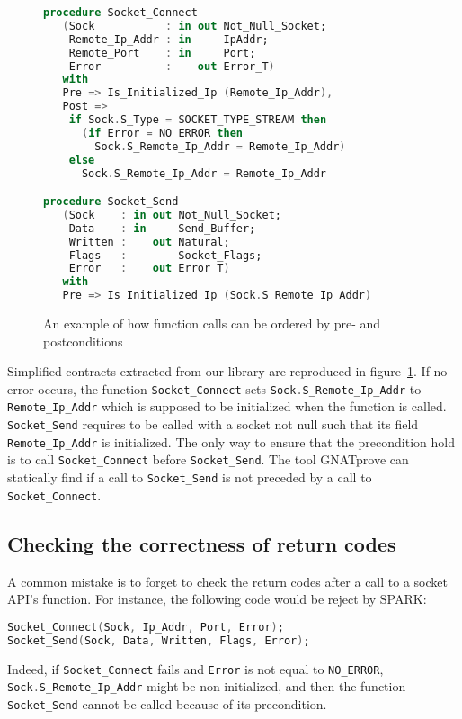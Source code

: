 \documentclass[conference]{IEEEtran}
\def\spark#1{\lstinline[language=Ada]{#1}}
\begin{document}
\begin{figure}
\begin{lstlisting}[language=Ada,basicstyle=\footnotesize\ttfamily]
procedure Socket_Connect
   (Sock           : in out Not_Null_Socket;
    Remote_Ip_Addr : in     IpAddr;
    Remote_Port    : in     Port;
    Error          :    out Error_T)
   with
   Pre => Is_Initialized_Ip (Remote_Ip_Addr),
   Post =>
    if Sock.S_Type = SOCKET_TYPE_STREAM then
      (if Error = NO_ERROR then
        Sock.S_Remote_Ip_Addr = Remote_Ip_Addr)
    else
      Sock.S_Remote_Ip_Addr = Remote_Ip_Addr

procedure Socket_Send
   (Sock    : in out Not_Null_Socket;
    Data    : in     Send_Buffer;
    Written :    out Natural;
    Flags   :        Socket_Flags;
    Error   :    out Error_T)
   with
   Pre => Is_Initialized_Ip (Sock.S_Remote_Ip_Addr)
\end{lstlisting}
\caption{An example of how function calls can be ordered by pre- and
postconditions}
\label{fig:functionorder}
\end{figure}

Simplified contracts extracted from our library are reproduced in
figure~\ref{fig:functionorder}. If no error occurs, the function
\spark{Socket_Connect} sets \spark{Sock.S_Remote_Ip_Addr} to
\spark{Remote_Ip_Addr} which is supposed to be
initialized when the function is called. \spark{Socket_Send} requires to be
called with a socket not null such that its field \spark{Remote_Ip_Addr} is
initialized. The only way to ensure that the precondition hold is to
call \spark{Socket_Connect} before \spark{Socket_Send}.
The tool GNATprove can statically find if a call to \spark{Socket_Send}
is not preceded by a call to \spark{Socket_Connect}.

\subsection{Checking the correctness of return codes}

A common mistake is to forget to check the return codes after a call to a socket
API's function. For instance, the following code would be reject by SPARK:
\begin{lstlisting}[language=Ada,basicstyle=\small\ttfamily]
Socket_Connect(Sock, Ip_Addr, Port, Error);
Socket_Send(Sock, Data, Written, Flags, Error);
\end{lstlisting}
Indeed, if \spark{Socket_Connect} fails and \spark{Error} is not equal to
\spark{NO_ERROR}, \spark{Sock.S_Remote_Ip_Addr} might be non initialized, and
then the function \spark{Socket_Send} cannot be called because of its
precondition.
\end{document}
